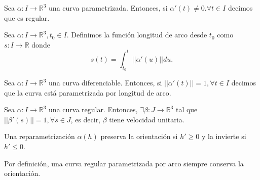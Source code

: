 \begin{defn}
  Sea $\alpha: I \to \mathbb{R}^{3}$ una curva parametrizada. Entonces, si $\alpha'(t) \neq 0. \forall t \in I$ decimos que es regular.
\end{defn}


\begin{defn}
  Sea $\alpha : I \to \mathbb{R}^{3}, t_{0} \in I$. Definimos la función longitud de arco desde $t_{0}$ como $s: I \to \mathbb{R}$ donde
  \[ 
    s(t) = \int_{t_{0}}^{t}  ||\alpha ' (u)|| du. 
  \] 
\end{defn}

\begin{defn}
  Sea $\alpha: I \to \mathbb{R}^{3}$ una curva diferenciable. Entonces, si $||\alpha'(t)|| = 1, \forall t \in I$ decimos que la curva está parametrizada por longitud de arco.
\end{defn}

\begin{theo}
  Sea $\alpha: I \to \mathbb{R}^{3}$ una curva regular. Entonces, $\exists \beta: J \to \mathbb{R}^{3}$ tal que $||\beta'(s)||=1, \forall s \in J$, es decir, $\beta$ tiene velocidad unitaria.
\end{theo}

\begin{obs}
  Una reparametrización $\alpha(h)$ preserva la orientación si $h' \geq 0$ y la invierte si $h' \leq 0$.
\end{obs}

\begin{obs}
  Por definición, una curva regular parametrizada por arco siempre conserva la orientación.
\end{obs}


